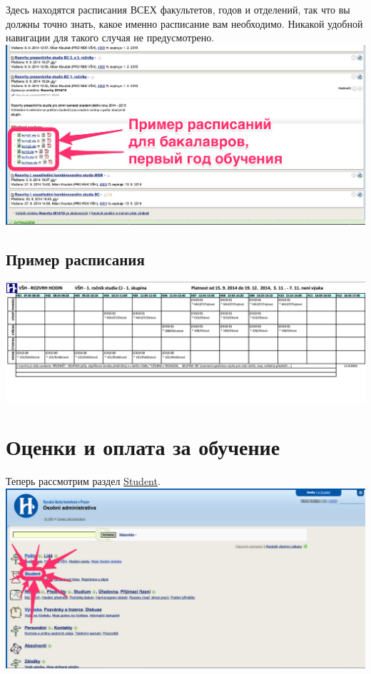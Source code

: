 \documentclass[a4paper,12pt]{article}
\begin{document}
Здесь находятся расписания ВСЕХ факультетов, годов и отделений, так что вы должны
точно знать, какое именно расписание вам необходимо. Никакой удобной навигации
для такого случая не предусмотрено. \\

\includegraphics[width=\textwidth]{s15}

\subsection{Пример расписания}

\includegraphics[width=\textwidth]{s16} \\

\newpage

\section{Оценки и оплата за обучение}

Теперь рассмотрим раздел \href{https://is.vsh.cz/auth/student/}{Student}. \\

\includegraphics[width=\textwidth]{s17} \\
\end{document}
